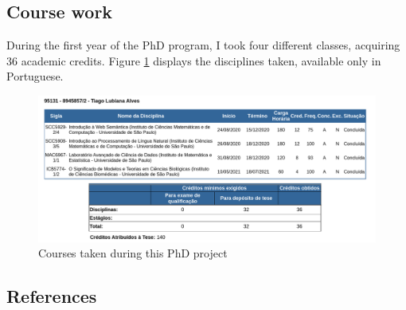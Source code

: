 \hypertarget{course-work}{%
\subsection{Course work}\label{course-work}}

During the first year of the PhD program, I took four different classes, acquiring 36 academic credits.
Figure \ref{fig:courses_taken} displays the disciplines taken, available only in Portuguese.

\begin{figure}
\hypertarget{fig:courses_taken}{%
\centering
\includegraphics[width=0.85\columnwidth]{images/janus_courses_taken.png}
\caption{Courses taken during this PhD project}\label{fig:courses_taken}
}
\end{figure}

\hypertarget{references}{%
\subsection{References}\label{references}}

